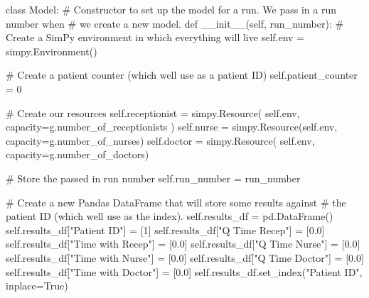 \documentclass[
  letterpaper,
  DIV=11,
  numbers=noendperiod]{scrreprt}
\newenvironment{Shaded}{\begin{snugshade}}{\end{snugshade}}
\newcommand{\CommentTok}[1]{\textcolor[rgb]{0.37,0.37,0.37}{#1}}
\newcommand{\DecValTok}[1]{\textcolor[rgb]{0.68,0.00,0.00}{#1}}
\newcommand{\FloatTok}[1]{\textcolor[rgb]{0.68,0.00,0.00}{#1}}
\newcommand{\FunctionTok}[1]{\textcolor[rgb]{0.28,0.35,0.67}{#1}}
\newcommand{\KeywordTok}[1]{\textcolor[rgb]{0.00,0.23,0.31}{#1}}
\newcommand{\NormalTok}[1]{\textcolor[rgb]{0.00,0.23,0.31}{#1}}
\newcommand{\OperatorTok}[1]{\textcolor[rgb]{0.37,0.37,0.37}{#1}}
\newcommand{\StringTok}[1]{\textcolor[rgb]{0.13,0.47,0.30}{#1}}
\newcommand{\VariableTok}[1]{\textcolor[rgb]{0.07,0.07,0.07}{#1}}
\begin{document}
\begin{Shaded}
\begin{Highlighting}[]
\KeywordTok{class}\NormalTok{ Model:}
    \CommentTok{\# Constructor to set up the model for a run.  We pass in a run number when}
    \CommentTok{\# we create a new model.}
    \KeywordTok{def} \FunctionTok{\_\_init\_\_}\NormalTok{(}\VariableTok{self}\NormalTok{, run\_number):}
        \CommentTok{\# Create a SimPy environment in which everything will live}
        \VariableTok{self}\NormalTok{.env }\OperatorTok{=}\NormalTok{ simpy.Environment()}

        \CommentTok{\# Create a patient counter (which we\textquotesingle{}ll use as a patient ID)}
        \VariableTok{self}\NormalTok{.patient\_counter }\OperatorTok{=} \DecValTok{0}

        \CommentTok{\# Create our resources}
        \VariableTok{self}\NormalTok{.receptionist }\OperatorTok{=}\NormalTok{ simpy.Resource(}
            \VariableTok{self}\NormalTok{.env, capacity}\OperatorTok{=}\NormalTok{g.number\_of\_receptionists}
\NormalTok{        )}
        \VariableTok{self}\NormalTok{.nurse }\OperatorTok{=}\NormalTok{ simpy.Resource(}\VariableTok{self}\NormalTok{.env, capacity}\OperatorTok{=}\NormalTok{g.number\_of\_nurses)}
        \VariableTok{self}\NormalTok{.doctor }\OperatorTok{=}\NormalTok{ simpy.Resource(}
            \VariableTok{self}\NormalTok{.env, capacity}\OperatorTok{=}\NormalTok{g.number\_of\_doctors)}

        \CommentTok{\# Store the passed in run number}
        \VariableTok{self}\NormalTok{.run\_number }\OperatorTok{=}\NormalTok{ run\_number}

        \CommentTok{\# Create a new Pandas DataFrame that will store some results against}
        \CommentTok{\# the patient ID (which we\textquotesingle{}ll use as the index).}
        \VariableTok{self}\NormalTok{.results\_df }\OperatorTok{=}\NormalTok{ pd.DataFrame()}
        \VariableTok{self}\NormalTok{.results\_df[}\StringTok{"Patient ID"}\NormalTok{] }\OperatorTok{=}\NormalTok{ [}\DecValTok{1}\NormalTok{]}
        \VariableTok{self}\NormalTok{.results\_df[}\StringTok{"Q Time Recep"}\NormalTok{] }\OperatorTok{=}\NormalTok{ [}\FloatTok{0.0}\NormalTok{]}
        \VariableTok{self}\NormalTok{.results\_df[}\StringTok{"Time with Recep"}\NormalTok{] }\OperatorTok{=}\NormalTok{ [}\FloatTok{0.0}\NormalTok{]}
        \VariableTok{self}\NormalTok{.results\_df[}\StringTok{"Q Time Nurse"}\NormalTok{] }\OperatorTok{=}\NormalTok{ [}\FloatTok{0.0}\NormalTok{]}
        \VariableTok{self}\NormalTok{.results\_df[}\StringTok{"Time with Nurse"}\NormalTok{] }\OperatorTok{=}\NormalTok{ [}\FloatTok{0.0}\NormalTok{]}
        \VariableTok{self}\NormalTok{.results\_df[}\StringTok{"Q Time Doctor"}\NormalTok{] }\OperatorTok{=}\NormalTok{ [}\FloatTok{0.0}\NormalTok{]}
        \VariableTok{self}\NormalTok{.results\_df[}\StringTok{"Time with Doctor"}\NormalTok{] }\OperatorTok{=}\NormalTok{ [}\FloatTok{0.0}\NormalTok{]}
        \VariableTok{self}\NormalTok{.results\_df.set\_index(}\StringTok{"Patient ID"}\NormalTok{, inplace}\OperatorTok{=}\VariableTok{True}\NormalTok{)}


\end{Highlighting}
\end{Shaded}
\end{document}
